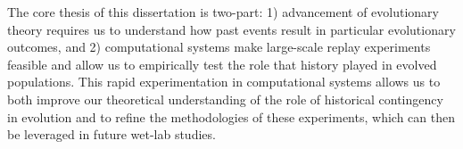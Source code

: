 The core thesis of this dissertation is two-part: 
1) advancement of evolutionary theory requires us to understand how past events result in particular evolutionary outcomes, and
2) computational systems make large-scale replay experiments feasible and allow us to empirically test the role that history played in evolved populations. 
This rapid experimentation in computational systems allows us to both improve our theoretical understanding of the role of historical contingency in evolution and to refine the methodologies of these experiments, which can then be leveraged in future wet-lab studies. 

